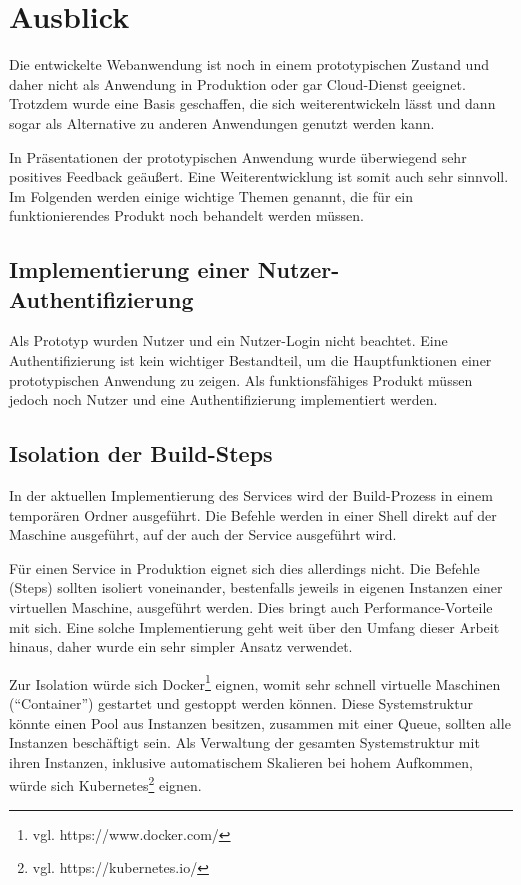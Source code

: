 \chapter{Ausblick}

Die entwickelte Webanwendung ist noch in einem prototypischen Zustand und daher nicht als Anwendung in Produktion oder gar Cloud-Dienst geeignet. Trotzdem wurde eine Basis geschaffen, die sich weiterentwickeln lässt und dann sogar als Alternative zu anderen Anwendungen genutzt werden kann.

In Präsentationen der prototypischen Anwendung wurde überwiegend sehr positives Feedback geäußert. Eine Weiterentwicklung ist somit auch sehr sinnvoll. Im Folgenden werden einige wichtige Themen genannt, die für ein funktionierendes Produkt noch behandelt werden müssen.

\section{Implementierung einer Nutzer-Authentifizierung}

Als Prototyp wurden Nutzer und ein Nutzer-Login nicht beachtet. Eine Authentifizierung ist kein wichtiger Bestandteil, um die Hauptfunktionen einer prototypischen Anwendung zu zeigen. Als funktionsfähiges Produkt müssen jedoch noch Nutzer und eine Authentifizierung implementiert werden.

\section{Isolation der Build-Steps}

In der aktuellen Implementierung des Services wird der Build-Prozess in einem temporären Ordner ausgeführt. Die Befehle werden in einer Shell direkt auf der Maschine ausgeführt, auf der auch der Service ausgeführt wird.

Für einen Service in Produktion eignet sich dies allerdings nicht. Die Befehle (Steps) sollten isoliert voneinander, bestenfalls jeweils in eigenen Instanzen einer virtuellen Maschine, ausgeführt werden. Dies bringt auch Performance-Vorteile mit sich. Eine solche Implementierung geht weit über den Umfang dieser Arbeit hinaus, daher wurde ein sehr simpler Ansatz verwendet.

Zur Isolation würde sich Docker\footnote{vgl. https://www.docker.com/} eignen, womit sehr schnell virtuelle Maschinen (``Container'') gestartet und gestoppt werden können. Diese Systemstruktur könnte einen Pool aus Instanzen besitzen, zusammen mit einer Queue, sollten alle Instanzen beschäftigt sein. Als Verwaltung der gesamten Systemstruktur mit ihren Instanzen, inklusive automatischem Skalieren bei hohem Aufkommen, würde sich Kubernetes\footnote{vgl. https://kubernetes.io/} eignen.

